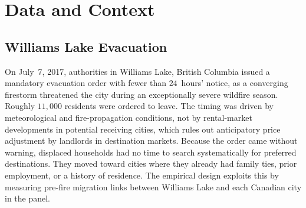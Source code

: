 \documentclass[12pt]{article}
\begin{document}
%
\section{Data and Context}
\label{sec:data}

\subsection{Williams Lake Evacuation}
\label{sec:wl_context}

On July~7, 2017, authorities in Williams Lake, British Columbia issued a
mandatory evacuation order with fewer than $24$~hours' notice, as a
converging firestorm threatened the city during an exceptionally severe
wildfire season. Roughly $11{,}000$ residents were ordered to leave. The
timing was driven by meteorological and fire-propagation conditions, not by
rental-market developments in potential receiving cities, which rules out
anticipatory price adjustment by landlords in destination markets. Because
the order came without warning, displaced households had no time to search
systematically for preferred destinations. They moved toward cities where
they already had family ties, prior employment, or a history of residence.
The empirical design exploits this by measuring pre-fire migration links
between Williams Lake and each Canadian city in the panel.
\end{document}
